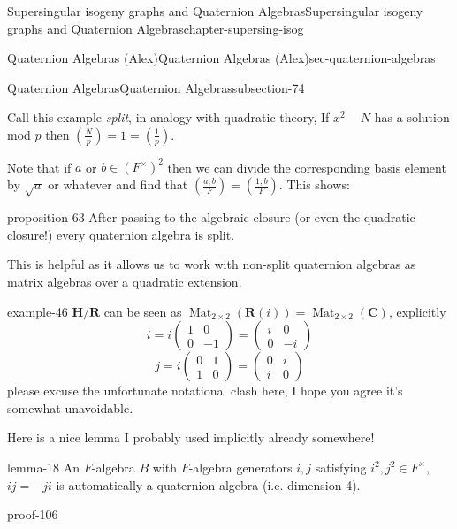 \documentclass[oneside,10pt,]{book}
\numberwithin{equation}{section}
\newcommand{\legendre}[2]{\left(\frac{#1}{#2}\right)}
\newcommand{\RR}{\mathbf{R}}
\newcommand{\CC}{\mathbf{C}}
\newcommand{\HH}{\mathbf{H}}
\DeclareMathOperator{\Mat}{Mat}
\newcommand{\amp}{&}
\begin{document}
\begin{chapterptx}{Supersingular isogeny graphs and Quaternion Algebras}{}{Supersingular isogeny graphs and Quaternion Algebras}{}{}{chapter-supersing-isog}
\begin{sectionptx}{Quaternion Algebras (Alex)}{}{Quaternion Algebras (Alex)}{}{}{sec-quaternion-algebras}
\begin{subsectionptx}{Quaternion Algebras}{}{Quaternion Algebras}{}{}{subsection-74}
\begin{introduction}{}
\hypertarget{p-893}{}%
Call this example \emph{split}, in analogy with quadratic theory,  If \(x^2 - N\) has a solution mod \(p\) then \(\legendre{N}{p} = 1 = \legendre{1}{p}\).%
\par
\hypertarget{p-894}{}%
Note that if \(a\) or \(b \in (F^\times)^2\) then we can divide the corresponding basis element by \(\sqrt{a}\) or whatever and find that \(\legendre{a,b}{F} = \legendre{1,b}{F}\). This shows:%
\begin{proposition}{}{}{proposition-63}%
\hypertarget{p-895}{}%
After passing to the algebraic closure (or even the quadratic closure!) every quaternion algebra is split.%
\end{proposition}
\hypertarget{p-896}{}%
This is helpful as it allows us to work with non-split quaternion algebras as matrix algebras over a quadratic extension.%
\begin{example}{}{example-46}%
\hypertarget{p-897}{}%
\(\HH/\RR\) can be seen as \(\Mat_{2\times 2}(\RR(i)) = \Mat_{2\times 2}(\CC)\), explicitly%
\begin{equation*}
i=  i\begin{pmatrix} 1\amp0\\0\amp -1\end{pmatrix} = \begin{pmatrix} i\amp0\\0\amp -i\end{pmatrix}
\end{equation*}
%
\begin{equation*}
j = i\begin{pmatrix} 0\amp1\\1\amp 0\end{pmatrix} = \begin{pmatrix} 0\amp i\\i\amp 0\end{pmatrix}
\end{equation*}
please excuse the unfortunate notational clash here, I hope you agree it's somewhat unavoidable.%
\end{example}
\hypertarget{p-898}{}%
Here is a nice lemma I probably used implicitly already somewhere!%
\begin{lemma}{}{}{lemma-18}%
\hypertarget{p-899}{}%
An \(F\)-algebra \(B\) with \(F\)-algebra generators \(i,j\) satisfying \(i^2,j^2\in F^\times\), \(ij = -ji\) is automatically a quaternion algebra (i.e. dimension 4).%
\end{lemma}
\begin{proofptx}{}{proof-106}
\hypertarget{p-900}{}%

\end{proofptx}
\end{introduction}
\end{subsectionptx}
\end{sectionptx}
\end{chapterptx}
\end{document}
